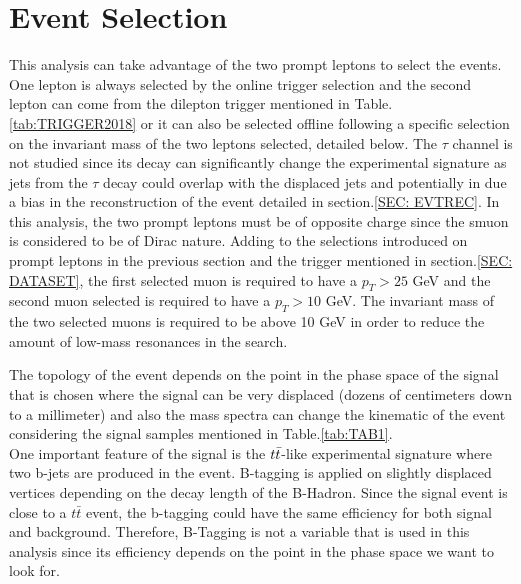\documentclass{cernatlasnote}
\begin{document}
\newpage
\section{Event Selection}
\label{SEC: EVTSEL}
    This analysis can take advantage of the two prompt leptons to select the events. One lepton is always selected by the online trigger selection and the second lepton can come from the dilepton trigger mentioned in Table.\ref{tab:TRIGGER2018} or it can also be selected offline following a specific selection on the invariant mass of the two leptons selected, detailed below. The $\tau$ channel is not studied since its decay can significantly change the experimental signature as jets from the $\tau$ decay could overlap with the displaced jets and potentially in due a bias in the reconstruction of the event detailed in section.\ref{SEC: EVTREC}. In this analysis, the two prompt leptons must be of opposite charge since the smuon is considered to be of Dirac nature.
    Adding to the selections introduced on prompt leptons in the previous section and the trigger mentioned in section.\ref{SEC: DATASET}, the first selected muon is required to have a $p_T > 25$ GeV and the second muon selected is required to have a $p_T > 10$ GeV. The invariant mass of the two selected muons is required to be above 10 GeV in order to reduce the amount of low-mass resonances in the search. 

    The topology of the event depends on the point in the phase space of the signal that is chosen where the signal can be very displaced (dozens of centimeters down to a millimeter) and also the mass spectra can change the kinematic of the event considering the signal samples mentioned in Table.\ref{tab:TAB1}.\\
    One important feature of the signal is the $t\Bar{t}$-like experimental signature where two b-jets are produced in the event. B-tagging is applied on slightly displaced vertices \cite{CMS-DP-2018-058} depending on the decay length of the B-Hadron. Since the signal event is close to a $t\bar{t}$ event, the b-tagging could have the same efficiency for both signal and background.
    Therefore, B-Tagging is not a variable that is used in this analysis since its efficiency depends on the point in the phase space we want to look for.\\
\end{document}
